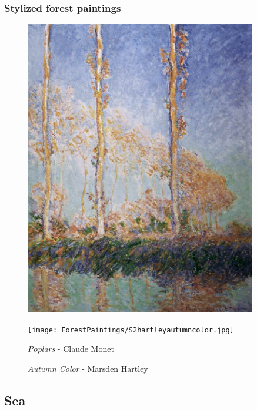 \documentclass[a4paper]{article}
\begin{document}
\subsubsection{Stylized forest paintings}
\begin {figure}[h!]
\centering
\begin{minipage}[b]{.49\textwidth}
	\centering
	\includegraphics[width=0.9\textwidth]{ForestPaintings/S1monetpoplars.jpg}
\end{minipage}
\hfill
\begin{minipage}[b]{.49\textwidth}
	\centering
	\texttt{[image: ForestPaintings/S2hartleyautumncolor.jpg]}
\end{minipage}
\begin{minipage}[t]{.49\textwidth}
	\caption{\emph{Poplars} - Claude Monet}
\end{minipage}
\begin{minipage}[t]{.49\textwidth}
	\caption{\emph{Autumn Color} - Marsden Hartley}
\end{minipage}
\end{figure}

\newpage
\subsection{Sea}
\end{document}
